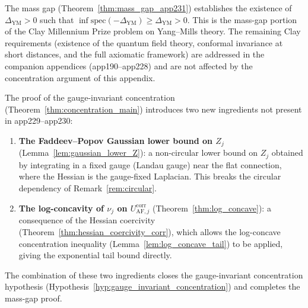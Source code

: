\begin{remark}
\label{rem:clay_status}
The mass gap (Theorem~\ref{thm:mass_gap_app231}) establishes the
existence of $\Delta_{\mathrm{YM}}>0$ such that
$\inf\mathrm{spec}(-\Delta_{\mathrm{YM}})\ge\Delta_{\mathrm{YM}}>0$.
This is the mass-gap portion of the Clay Millennium Prize problem
on Yang--Mills theory. The remaining Clay requirements (existence of
the quantum field theory, conformal invariance at short distances,
and the full axiomatic framework) are addressed in the companion
appendices (app190--app228) and are not affected by the
concentration argument of this appendix.
\end{remark}

\begin{remark}
\label{rem:new_ingredients}
The proof of the gauge-invariant concentration
(Theorem~\ref{thm:concentration_main}) introduces two new ingredients
not present in app229--app230:
\begin{enumerate}
\item \textbf{The Faddeev--Popov Gaussian lower bound on $Z_{j}$}
(Lemma~\ref{lem:gaussian_lower_Z}): a non-circular lower bound on
$Z_{j}$ obtained by integrating in a fixed gauge (Landau gauge) near
the flat connection, where the Hessian is the gauge-fixed Laplacian.
This breaks the circular dependency of Remark~\ref{rem:circular}.
\item \textbf{The log-concavity of $\nu_{j}$ on $U_{\mathrm{AF},j}^{
\mathrm{corr}}$} (Theorem~\ref{thm:log_concave}): a consequence of
the Hessian coercivity (Theorem~\ref{thm:hessian_coercivity_corr}),
which allows the log-concave concentration inequality
(Lemma~\ref{lem:log_concave_tail}) to be applied, giving the
exponential tail bound directly.
\end{enumerate}
The combination of these two ingredients closes the gauge-invariant
concentration hypothesis (Hypothesis~\ref{hyp:gauge_invariant_concentration})
and completes the mass-gap proof.
\end{remark}

\endinput
